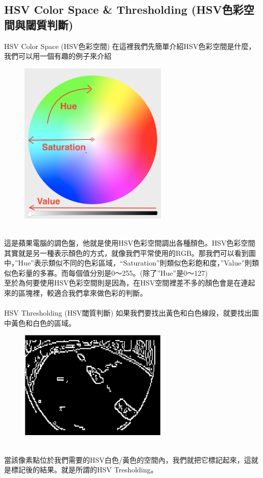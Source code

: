 \documentclass{article}
\begin{document}
\subsection{HSV Color Space \& Thresholding (HSV色彩空間與閾質判斷)}
HSV Color Space (HSV色彩空間)
在這裡我們先簡單介紹HSV色彩空間是什麼，我們可以用一個有趣的例子來介紹
\begin{figure}[htp]
    \begin{center}
        \includegraphics[width=200pt]{pic/3_2_8.png}
    \end{center}
\end{figure}
\\
這是蘋果電腦的調色盤，他就是使用HSV色彩空間調出各種顏色。HSV色彩空間其實就是另一種表示顏色的方式，就像我們平常使用的RGB。那我們可以看到圖中，”Hue”表示類似不同的色彩區域，“Saturation”則類似色彩飽和度，”Value”則類似色彩量的多寡。而每個值分別是0～255。(除了”Hue”是0～127)
\\至於為何要使用HSV色彩空間則是因為，在HSV空間裡差不多的顏色會是在連起來的區塊裡，較適合我們拿來做色彩的判斷。
\\\\HSV Thresholding (HSV閾質判斷)
如果我們要找出黃色和白色線段，就要找出圖中黃色和白色的區域。
\begin{figure}[htp]
    \begin{center}
        \includegraphics[width=200pt]{pic/3_2_9.png}
    \end{center}
\end{figure}
\\
當該像素點位於我們需要的HSV白色/黃色的空間內，我們就把它標記起來，這就是標記後的結果。就是所謂的HSV Tresholding。
\end{document}
